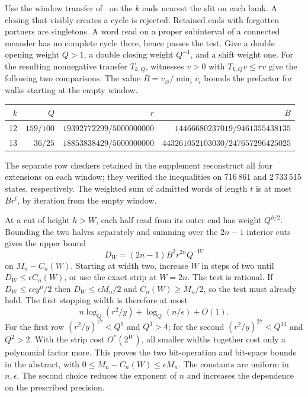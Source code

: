 \documentclass[11pt]{article}
\begin{document}
Use the window transfer of~\cite{windows} on the \(k\) ends nearest the slit on each bank. A closing that visibly creates a cycle is rejected. Retained ends with forgotten partners are singletons. A word read on a proper subinterval of a connected meander has no complete cycle there, hence passes the test. Give a double opening weight \(Q>1\), a double closing weight \(Q^{-1}\), and a shift weight one. For the resulting nonnegative transfer \(T_{k,Q}\), witnesses \(v>0\) with \(T_{k,Q}v\le r v\) give the following two comparisons. The value \(B=v_\varnothing/\min_i v_i\) bounds the prefactor for walks starting at the empty window.
\begin{center}\small
\begin{tabular}{rrrr}
\toprule
\(k\)& \(Q\)& \(r\)& \(B\)\\\midrule
12 & \(159/100\) & \(19392772299/5000000000\) & \(14466680237019/9461355438135\)\\
13 & \(36/25\) & \(18853838429/5000000000\) & \(443261052103030/247657296425025\)\\
\bottomrule
\end{tabular}
\end{center}
The separate row checkers retained in the supplement reconstruct all four extensions on each window; they verified the inequalities on 716\,861 and 2\,733\,515 states, respectively. The weighted sum of admitted words of length \(t\) is at most \(B r^t\), by iteration from the empty window.

At a cut of height \(h>W\), each half read from its outer end has weight \(Q^{h/2}\). Bounding the two halves separately and summing over the \(2n-1\) interior cuts gives the upper bound
\[
 D_W=(2n-1)B^2r^{2n}Q^{-W}
\]
on \(M_n-C_n(W)\). Starting at width two, increase \(W\) in steps of two until \(D_W\le\epsilon C_n(W)\), or use the exact strip at \(W=2n\). The test is rational. If \(D_W\le\epsilon c y^n/2\) then \(D_W\le\epsilon M_n/2\) and \(C_n(W)\ge M_n/2\), so the test must already hold. The first stopping width is therefore at most
\[
 n\log_Q(r^2/y)+\log_Q(n/\epsilon)+O(1).
\]
For the first row \((r^2/y)^{17}<Q^9\) and \(Q^3>4\); for the second \((r^2/y)^{27}<Q^{14}\) and \(Q^2>2\). With the strip cost \(O^*(2^W)\), all smaller widths together cost only a polynomial factor more. This proves the two bit-operation and bit-space bounds in the abstract, with \(0\le M_n-C_n(W)\le\epsilon M_n\). The constants are uniform in \(n,\epsilon\). The second choice reduces the exponent of \(n\) and increases the dependence on the prescribed precision.
\end{document}
